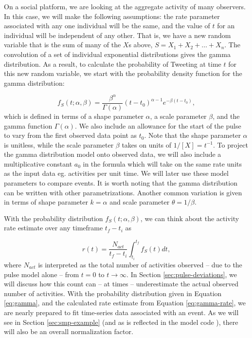 \documentclass{article}
\begin{document}
On a social platform, we are looking at the aggregate activity of many observers. In this case, we will make the following assumptions: the rate parameter associated with any one individual will be the same, and the value of $t$ for an individual will be independent of any other. That is, we have a new random variable that is the sum of many of the $X$s above, $S = X_1 + X_2 + \ldots + X_n$. The convolution of a set of individual exponential distributions gives the gamma distribution.\cite{Hogg2013} As a result, to calculate the probability of Tweeting at time $t$ for this new random variable, we start with the probability density function for the gamma distribution: 

\begin{equation}
f_S(t;\alpha,\beta) = \frac{ \beta^{\alpha} } {\Gamma(\alpha) } (t-t_0)^{\alpha-1} e^{-\beta(t-t_0)}, 
\label{eq:gamma}
\end{equation}
which is defined in terms of a shape parameter $\alpha$, a scale parameter $\beta$, and the gamma function $\Gamma(\alpha)$.\cite{Hogg2013} We also include an allowance for the start of the pulse to vary from the first observed data point as $t_0$. Note that the shape parameter $\alpha$ is unitless, while the scale parameter $\beta$ takes on units of $1/[X] = t^{-1}$. To project the gamma distribution model onto observed data, we will also include a multiplicative constant $a_0$ in the formula which will take on the same rate units as the input data eg. activities per unit time. We will later use these model parameters to compare events. It is worth noting that the gamma distribution can be written with other parametrizations. Another common variation is given in terms of shape parameter $k = \alpha$ and scale parameter $\theta = 1/\beta$. 

With the probability distribution $f_S(t;\alpha,\beta)$, we can think about the activity rate estimate over any timeframe $t_f - t_i$ as

\begin{equation}
r(t) = \frac{ N_{act} }{ t_f - t_i } \int_{t_i}^{t_f} f_S(t) dt, 
\label{eq:gamma-rate}
\end{equation}
where $N_{act}$ is interpreted as the total number of activities observed -- due to the pulse model alone -- from $t = 0$ to $t \rightarrow \infty$. In Section \ref{sec:pulse-deviations}, we will discuss how this count can -- at times -- underestimate the actual observed number of activities. With the probability distribution given in Equation \ref{eq:gamma}, and the calculated rate estimate from Equation \ref{eq:gamma-rate}, we are nearly prepared to fit time-series data associated with an event. As we will see in Section \ref{sec:smp-example} (and as is reflected in the model code \cite{pulse}), there will also be an overall normalization factor.  
\end{document}
